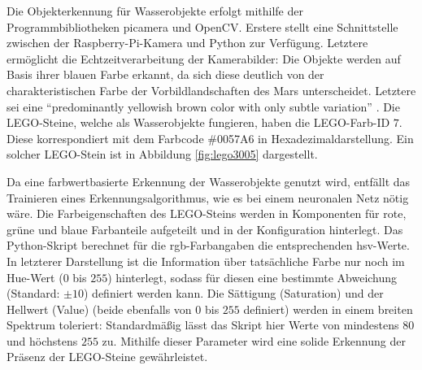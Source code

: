 Die Objekterkennung für Wasserobjekte erfolgt mithilfe der Programmbibliotheken picamera und OpenCV.
Erstere stellt eine Schnittstelle zwischen der Raspberry-Pi-Kamera und Python zur Verfügung.
Letztere ermöglicht die Echtzeitverarbeitung der Kamerabilder:
Die Objekte werden auf Basis ihrer blauen Farbe erkannt, da sich diese deutlich von der charakteristischen Farbe der Vorbildlandschaften des Mars unterscheidet.
Letztere sei eine \enquote{predominantly yellowish brown color with only subtle variation} \cite{maki1999}.
Die LEGO-Steine, welche als Wasserobjekte fungieren, haben die LEGO-Farb-ID $7$.
Diese korrespondiert mit dem Farbcode \#0057A6 in Hexadezimaldarstellung.
Ein solcher LEGO-Stein ist in Abbildung \ref{fig:lego3005} dargestellt.

Da eine farbwertbasierte Erkennung der Wasserobjekte genutzt wird, entfällt das Trainieren eines Erkennungsalgorithmus, wie es bei einem neuronalen Netz nötig wäre.
Die Farbeigenschaften des LEGO-Steins werden in Komponenten für rote, grüne und blaue Farbanteile aufgeteilt und in der Konfiguration hinterlegt.
Das Python-Skript berechnet für die \acs{rgb}-Farbangaben die entsprechenden \acs{hsv}-Werte.
In letzterer Darstellung ist die Information über tatsächliche Farbe nur noch im Hue-Wert ($0$ bis $255$) hinterlegt, sodass für diesen eine bestimmte Abweichung (Standard: $\pm 10$) definiert werden kann.
Die Sättigung (Saturation) und der Hellwert (Value) (beide ebenfalls von $0$ bis $255$ definiert) werden in einem breiten Spektrum toleriert:
Standardmäßig lässt das Skript hier Werte von mindestens $80$ und höchstens $255$ zu.
Mithilfe dieser Parameter wird eine solide Erkennung der Präsenz der LEGO-Steine gewährleistet.